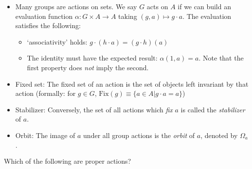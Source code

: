 \documentclass[1    0pt, answers]{exam} \renewcommand{\baselinestretch}{1.05}
\theoremstyle{plain}
\theoremstyle{definition}
\begin{document}
\begin{questions}
\begin{solution}
\begin{itemize}
\item Many groups are actions on sets. We say $G$ acts on $A$ if we can build an evaluation function $\alpha: G \times A \to A$ taking $(g, a) \mapsto g \cdot a$. The evaluation satisfies the following:
\begin{itemize}
    \item `associativity' holds: $g \cdot (h \cdot a) = (g \cdot h)(a)$
    \item The identity must have the expected result: $\alpha(1, a) = a$. Note that the first property does \emph{not} imply the second.
\end{itemize}
\item Fixed set: The fixed set of an action is the set of objects left invariant by that action (formally: for $g \in G$, $\text{Fix}(g) \equiv \{ a \in A | g \cdot a = a \}$)
\item Stabilizer: Conversely, the set of all actions which \emph{fix} $a$ is called the \emph{stabilizer} of $a$.
\item Orbit: The image of $a$ under all group actions is the \emph{orbit} of $a$, denoted by $\Omega_a$.
\end{itemize}

\question Which of the following are proper actions?


\end{solution}
\end{questions}
\end{document}
